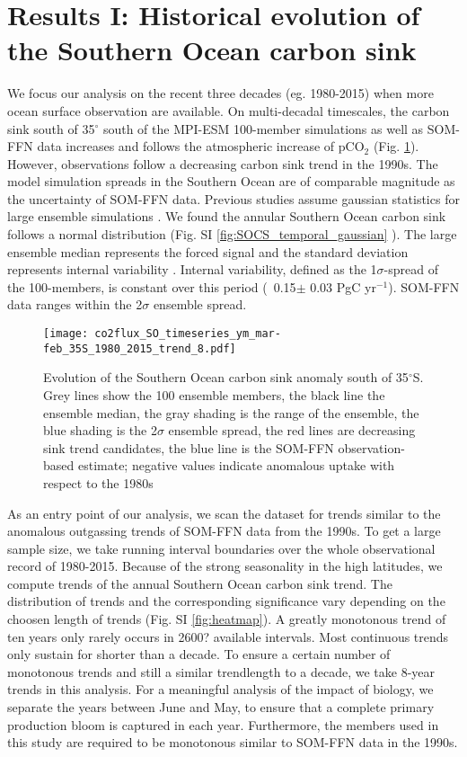 \documentclass[12pt]{article}
\begin{document}
\section{Results I: Historical evolution of the Southern Ocean carbon sink}

We focus our analysis on the recent three decades (eg. 1980-2015) when more ocean surface observation are available. On multi-decadal timescales, the carbon sink south of 35$^\circ$ south of the MPI-ESM 100-member simulations as well as SOM-FFN data increases and follows the atmospheric increase of pCO$_2$ (Fig. \ref{fig:evolution_southern_ocean_carbon_sink}). However, observations follow a decreasing carbon sink trend in the 1990s. The model simulation spreads in the Southern Ocean are of comparable magnitude as the uncertainty of SOM-FFN data. Previous studies assume gaussian statistics for large ensemble simulations \citep{Thompson2015}. We found the annular Southern Ocean carbon sink follows a normal distribution (Fig. SI \ref{fig:SOCS_temporal_gaussian} ). The large ensemble median represents the forced signal and the standard deviation represents internal variability \citep{Deser2012}. Internal variability, defined as the 1$\sigma$-spread of the 100-members, is constant over this period (~0.15$\pm$ 0.03 PgC yr$^{-1}$). SOM-FFN data ranges within the 2$\sigma$ ensemble spread. 

\begin{figure}
\texttt{[image: co2flux\_SO\_timeseries\_ym\_mar-feb\_35S\_1980\_2015\_trend\_8.pdf]}
\caption{Evolution of the Southern Ocean carbon sink anomaly south of 35$^\circ$S. Grey lines show the 100 ensemble members, the black line the ensemble median, the gray shading is the range of the ensemble, the blue shading is the 2$\sigma$ ensemble spread, the red lines are decreasing sink trend candidates, the blue line is the SOM-FFN observation-based estimate; negative values indicate anomalous uptake with respect to the 1980s}
\label{fig:evolution_southern_ocean_carbon_sink}
\end{figure}

As an entry point of our analysis, we scan the dataset for trends similar to the anomalous outgassing trends of SOM-FFN data from the 1990s. To get a large sample size, we take running interval boundaries over the whole observational record of 1980-2015. Because of the strong seasonality in the high latitudes, we compute trends of the annual Southern Ocean carbon sink trend. The distribution of trends and the corresponding significance vary depending on the choosen length of trends (Fig. SI \ref{fig:heatmap}). A greatly monotonous trend of ten years only rarely occurs in 2600? available intervals. Most continuous trends only sustain for shorter than a decade. To ensure a certain number of monotonous trends and still a similar trendlength to a decade, we take 8-year trends in this analysis. For a meaningful analysis of the impact of biology, we separate the years between June and May, to ensure that a complete primary production bloom is captured in each year. Furthermore, the members used in this study are required to be monotonous similar to SOM-FFN data in the 1990s.
 
\end{document}
